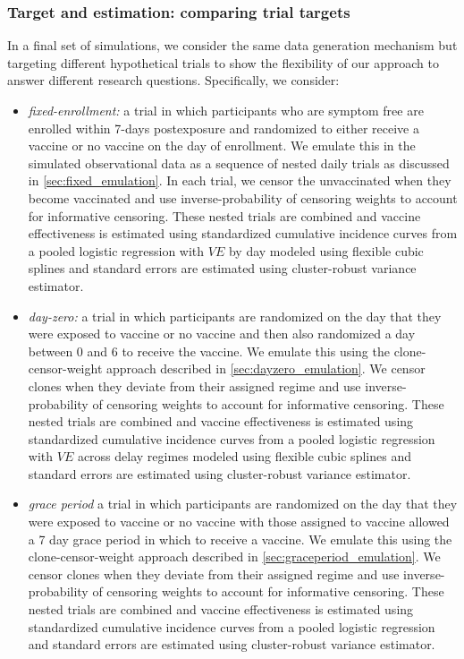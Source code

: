 \begin{appendices}
\begin{refsection}
    \subsubsection{Target and estimation: comparing trial targets}
    In a final set of simulations, we consider the same data generation mechanism but targeting different hypothetical trials to show the flexibility of our approach to answer different research questions. Specifically, we consider:
    \begin{itemize}
        \item \textit{fixed-enrollment:} a trial in which participants who are symptom free are enrolled within 7-days postexposure and randomized to either receive a vaccine or no vaccine on the day of enrollment. We emulate this in the simulated observational data as a sequence of nested daily trials as discussed in \ref{sec:fixed_emulation}. In each trial, we censor the unvaccinated when they become vaccinated and use inverse-probability of censoring weights to account for informative censoring. These nested trials are combined and vaccine effectiveness is estimated using standardized cumulative incidence curves from a pooled logistic regression with $VE$ by day modeled using flexible cubic splines and standard errors are estimated using cluster-robust variance estimator. 
        \item \textit{day-zero:} a trial in which participants are randomized on the day that they were exposed to vaccine or no vaccine and then also randomized a day between 0 and 6 to receive the vaccine. We emulate this using the clone-censor-weight approach described in \ref{sec:dayzero_emulation}. We censor clones when they deviate from their assigned regime and use inverse-probability of censoring weights to account for informative censoring. These nested trials are combined and vaccine effectiveness is estimated using standardized cumulative incidence curves from a pooled logistic regression  with $VE$ across delay regimes modeled using flexible cubic splines and standard errors are estimated using cluster-robust variance estimator.
        \item \textit{grace period} a trial in which participants are randomized on the day that they were exposed to vaccine or no vaccine with those assigned to vaccine allowed a 7 day grace period in which to receive a vaccine. We emulate this using the clone-censor-weight approach described in \ref{sec:graceperiod_emulation}. We censor clones when they deviate from their assigned regime and use inverse-probability of censoring weights to account for informative censoring. These nested trials are combined and vaccine effectiveness is estimated using standardized cumulative incidence curves from a pooled logistic regression and standard errors are estimated using cluster-robust variance estimator.
    \end{itemize}


\end{refsection}
\end{appendices}
